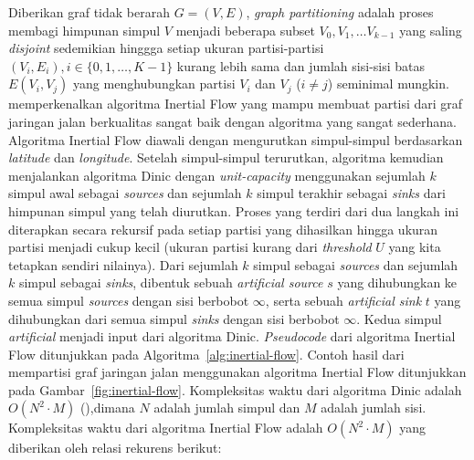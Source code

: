 Diberikan graf tidak berarah $G=(V,E)$,  \textit{graph partitioning} adalah proses membagi himpunan simpul $V$ menjadi beberapa subset $V_0,V_1,\ldots V_{k-1}$ yang saling \textit{disjoint} sedemikian hinggga setiap ukuran partisi-partisi $(V_i,E_i),i\in\{0,1,\ldots, K-1\}$ kurang lebih sama dan jumlah sisi-sisi batas $E(V_i,V_j)$ yang menghubungkan partisi $V_i$ dan $V_j$ ($i\neq j$) seminimal mungkin. \cite{Schild2015} memperkenalkan algoritma Inertial Flow yang mampu membuat partisi dari graf jaringan jalan berkualitas sangat baik dengan algoritma yang sangat sederhana. Algoritma Inertial Flow diawali dengan mengurutkan simpul-simpul berdasarkan \textit{latitude} dan \textit{longitude}. Setelah simpul-simpul terurutkan, algoritma kemudian menjalankan algoritma Dinic dengan \textit{unit-capacity} \cite{Dinitz2006} menggunakan sejumlah $k$ simpul awal sebagai \textit{sources} dan sejumlah $k$ simpul terakhir sebagai \textit{sinks} dari himpunan simpul yang telah diurutkan. Proses yang terdiri dari dua langkah ini diterapkan secara rekursif pada setiap partisi yang dihasilkan hingga ukuran partisi menjadi cukup kecil (ukuran partisi kurang dari \textit{threshold} $U$ yang kita tetapkan sendiri nilainya). Dari sejumlah $k$ simpul sebagai \textit{sources} dan sejumlah $k$ simpul sebagai \textit{sinks}, dibentuk sebuah \textit{artificial source} $s$ yang dihubungkan ke semua simpul \textit{sources} dengan sisi berbobot $\infty$, serta sebuah \textit{artificial sink} $t$ yang dihubungkan dari semua simpul \textit{sinks} dengan sisi berbobot $\infty$. Kedua simpul \textit{artificial} menjadi input dari algoritma Dinic. \textit{Pseudocode} dari algoritma Inertial Flow ditunjukkan pada Algoritma~\ref{alg:inertial-flow}. Contoh hasil dari mempartisi graf jaringan jalan menggunakan algoritma Inertial Flow ditunjukkan pada Gambar~\ref{fig:inertial-flow}. Kompleksitas waktu dari algoritma Dinic adalah $O(N^2\cdot M)$ (\cite{Dinitz2006}),dimana $N$ adalah jumlah simpul dan $M$ adalah jumlah sisi. Kompleksitas waktu dari algoritma Inertial Flow adalah $O(N^2\cdot M)$ yang diberikan oleh relasi rekurens berikut:

